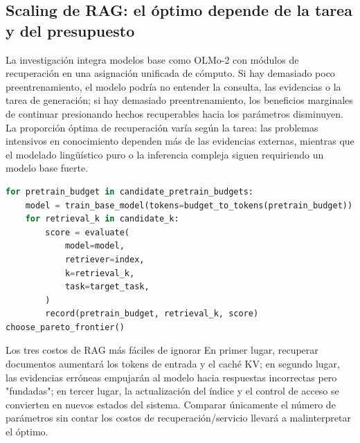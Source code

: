 \subsection{Scaling de RAG: el óptimo depende de la tarea y del presupuesto}

La investigación integra modelos base como OLMo-2 con módulos de recuperación en una asignación unificada de cómputo. Si hay demasiado poco preentrenamiento, el modelo podría no entender la consulta, las evidencias o la tarea de generación; si hay demasiado preentrenamiento, los beneficios marginales de continuar presionando hechos recuperables hacia los parámetros disminuyen. La proporción óptima de recuperación varía según la tarea: las problemas intensivos en conocimiento dependen más de las evidencias externas, mientras que el modelado lingüístico puro o la inferencia compleja siguen requiriendo un modelo base fuerte.




\begin{lstlisting}[language=Python,caption={Pseudocódigo para explorar la asignación entre preentrenamiento y recuperación bajo presupuesto fijo}]
for pretrain_budget in candidate_pretrain_budgets:
    model = train_base_model(tokens=budget_to_tokens(pretrain_budget))
    for retrieval_k in candidate_k:
        score = evaluate(
            model=model,
            retriever=index,
            k=retrieval_k,
            task=target_task,
        )
        record(pretrain_budget, retrieval_k, score)
choose_pareto_frontier()
\end{lstlisting}

\begin{warningbox}{Los tres costos de RAG más fáciles de ignorar}
En primer lugar, recuperar documentos aumentará los tokens de entrada y el caché KV; en segundo lugar, las evidencias erróneas empujarán al modelo hacia respuestas incorrectas pero "fundadas"; en tercer lugar, la actualización del índice y el control de acceso se convierten en nuevos estados del sistema. Comparar únicamente el número de parámetros sin contar los costos de recuperación/servicio llevará a malinterpretar el óptimo.
\end{warningbox}


